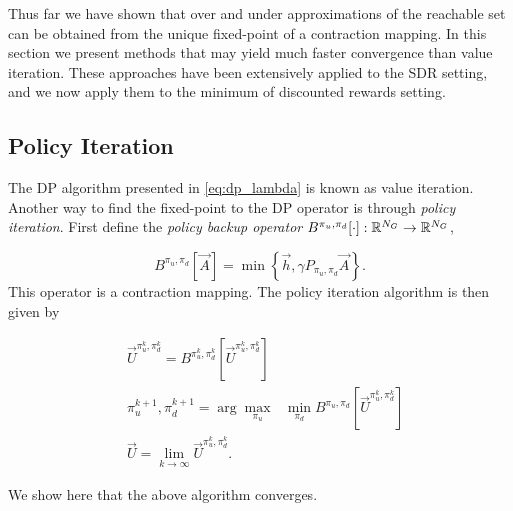 Thus far we have shown that over and under approximations of the reachable set can be obtained from the unique fixed-point of a contraction mapping. In this section we present methods that  may yield much faster convergence than value iteration. These approaches have been extensively applied to the SDR setting, and we now apply them to the minimum of discounted rewards setting. 

\subsection{Policy Iteration}

The DP algorithm presented in \eqref{eq:dp_lambda} is known as value iteration. Another way to find the fixed-point to the DP operator is through \emph{policy iteration}. First define the \emph{policy backup operator} $B^{\pi_u, \pi_d}[\cdot]: \mathbb{R}^{N_G} \rightarrow \mathbb{R}^{N_G}$, 

\begin{equation}
B^{\pi_u, \pi_d}[\vec{A}] = \min\left\{ \vec{h}, \gamma P_{\pi_u, \pi_d} \vec{A} \right \}.
\end{equation}
\noindent This operator is a contraction mapping. The policy iteration algorithm is then given by

\begin{subequations}\label{eq:pi}
\begin{align}
&\vec{U}^{\pi_u^k, \pi_d^k} = B^{\pi_u^k, \pi_d^k}[\vec{U}^{\pi_u^k, \pi_d^k}] \label{eq:pi_a}\\
&\pi_u^{k+1}, \pi_d^{k+1} = \arg\underset{\pi_u}{\max}\text{ }\underset{ \pi_d}{\min}B^{\pi_u, \pi_d}[\vec{U}^{\pi_u^k, \pi_d^k}]\\ 
&\vec{U} = \lim_{k\rightarrow \infty} \vec{U}^{\pi_u^k, \pi_d^k}.
\end{align}
\end{subequations}

We show here that the above algorithm converges.
%


